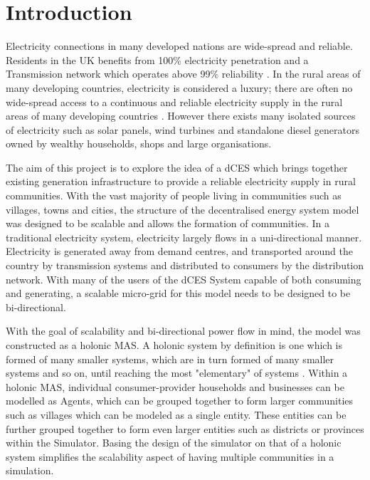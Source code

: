 \chapter{Introduction}
\label{introduction}

Electricity connections in many developed nations are wide-spread and reliable. Residents in the UK benefits from 100\% electricity penetration\cite{World-Bank-web:2015} and a Transmission network which operates above 99\% reliability \cite{NG-web:2015}. In the rural areas of many developing countries, electricity is considered a luxury; there are often no wide-spread access to a continuous and reliable electricity supply in the rural areas of many developing countries \cite{IEA-web:2015}. However there exists many isolated sources of electricity such as solar panels, wind turbines and standalone diesel generators owned by wealthy households, shops and large organisations. 

The aim of this project is to explore the idea of a \ac{dCES} which brings together existing generation infrastructure to provide a reliable electricity supply in rural communities. With the vast majority of people living in communities such as villages, towns and cities, the structure of the decentralised energy system model was designed to be scalable and allows the formation of communities. In a traditional electricity system, electricity largely flows in a uni-directional manner. Electricity is generated away from demand centres, and transported around the country by transmission systems and distributed to consumers by the distribution network. With many of the users of the dCES System capable of both consuming and generating, a scalable micro-grid for this model needs to be designed to be bi-directional.

With the goal of scalability and bi-directional power flow in mind, the model was constructed as a holonic \ac{MAS}. A holonic system by definition is one which is formed of many smaller systems, which are in turn formed of many smaller systems and so on, until reaching the most "elementary" of systems \cite{Pitt:Holonic_Institutions}. Within a holonic MAS, individual consumer-provider households and businesses can be modelled as Agents, which can be grouped together to form larger communities such as villages which can be modeled as a single entity. These entities can be further grouped together to form even larger entities such as districts or provinces within the Simulator. Basing the design of the simulator on that of a holonic system simplifies the scalability aspect of having multiple communities in a simulation. 

